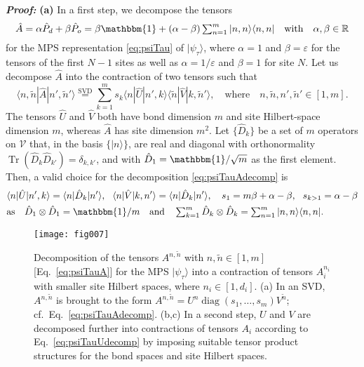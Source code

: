\documentclass[english,11pt,aps,pra,onecolumn,tightenlines,groupedaddress,superscriptaddress,notitlepage,floatfix,fleqn]{revtex4-1}
\newcommand{\id}{\mathbbm{1}}
\newcommand{\bra}{\langle}
\newcommand{\ket}{\rangle}
\newcommand{\Tr}{\operatorname{Tr}}
\newcommand{\hA}{\hat{A}}
\newcommand{\hD}{\hat{D}}
\newcommand{\hP}{\hat{P}}
\newcommand{\hU}{\hat{U}}
\newcommand{\hV}{\hat{V}}
\newcommand{\RR}{\mathbb{R}}
\newcommand{\mc}[1]{\mathcal{#1}}
\newcommand{\V}{\mc{V}}
\newcommand{\veps}{\varepsilon}
\newcommand{\Emph}[1]{\textbf{\emph{#1}}}
\begin{document}
\Emph{Proof:}
\textbf{(a)} In a first step, we decompose the tensors
\begin{equation}\label{eq:psiTauA}\textstyle
	\hA=\alpha \hP_d+\beta\hP_o
	=\beta \id+(\alpha-\beta)\sum_{n=1}^m|n,n\ket\bra n,n| \quad\text{with}\quad 
	\alpha,\beta\in\RR
\end{equation}
for the MPS representation \eqref{eq:psiTau} of $|\psi_\tau\ket$, where $\alpha=1$ and $\beta=\veps$ for the tensors of the first $N-1$ sites as well as $\alpha=1/\veps$ and $\beta=1$ for site $N$. Let us decompose $\hA$ into the contraction of two tensors such that
\begin{equation}\label{eq:psiTauAdecomp}\textstyle
	\bra n,\tilde{n}|\hA|n',\tilde{n}'\ket
	\stackrel{\text{SVD}}{=}
	\sum_{k=1}^m s_k \bra n|\hU|n',k\ket \bra \tilde{n}|\hV|k,\tilde{n}'\ket,\quad\text{where}\quad
	n,\tilde{n},n',\tilde{n}'\in[1,m].
\end{equation}
The tensors $\hU$ and $\hV$ both have bond dimension $m$ and site Hilbert-space dimension $m$, whereas $\hA$ has site dimension $m^2$. Let $\{\hD_k\}$ be a set of $m$ operators on $\V$ that, in the basis $\{|n\ket\}$, are real and diagonal with orthonormality $\Tr(\hD_k\hD_{k'})=\delta_{k,k'}$, and with $\hD_1=\id/\sqrt{m}$ as the first element. Then, a valid choice for the decomposition \eqref{eq:psiTauAdecomp} is
\begin{subequations}\label{eq:psiTauAdecomp2}
\begin{align}
	&\bra n|\hU|n',k\ket=\bra n|\hD_k |n'\ket, \ \
	\bra n|\hV|k,n'\ket=\bra n|\hD_k |n'\ket,\quad
	s_1=m\beta+\alpha-\beta, \ \ s_{k>1}=\alpha-\beta\\
	&\textstyle\text{as}\quad
	\hD_1\otimes\hD_1=\id/m \quad \text{and}\quad
	\sum_{k=1}^m \hD_k\otimes\hD_k=\sum_{n=1}^m|n,n\ket\bra n,n|.
\end{align}
\end{subequations}
\begin{figure*}[t]
\label{fig:psiTauDecomp}
\texttt{[image: fig007]}
\caption{Decomposition of the tensors $A^{n,\tilde{n}}$ with $n,\tilde{n}\in[1,m]$ [Eq.~\eqref{eq:psiTauA}] for the MPS $|\psi_\tau\ket$ into a contraction of tensors $A^{n_i}_i$ with smaller site Hilbert spaces, where $n_i\in[1,d_i]$. (a) In an SVD, $A^{n,\tilde{n}}$ is brought to the form $A^{n,\tilde{n}}=U^{n}\operatorname{diag}(s_1,\dotsc,s_m)V^{\tilde{n}}$; cf.\ Eq.~\eqref{eq:psiTauAdecomp}. (b,c) In a second step, $U$ and $V$ are decomposed further into contractions of tensors $A_i$ according to Eq.~\eqref{eq:psiTauUdecomp} by imposing suitable tensor product structures for the bond spaces and site Hilbert spaces.}
\end{figure*}
\end{document}

